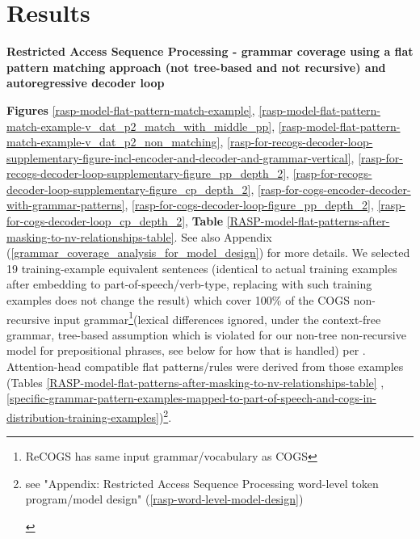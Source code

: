 \documentclass[11pt]{article}
\begin{document}
\section{Results}
\textbf{Restricted Access Sequence Processing - grammar coverage using a flat pattern matching approach (not tree-based and not recursive) and autoregressive decoder loop}

\textbf{Figures} \ref{rasp-model-flat-pattern-match-example}, \ref{rasp-model-flat-pattern-match-example-v_dat_p2_match_with_middle_pp}, \ref{rasp-model-flat-pattern-match-example-v_dat_p2_non_matching}, \ref{rasp-for-recogs-decoder-loop-supplementary-figure-incl-encoder-and-decoder-and-grammar-vertical}, \ref{rasp-for-recogs-decoder-loop-supplementary-figure_pp_depth_2}, \ref{rasp-for-recogs-decoder-loop-supplementary-figure_cp_depth_2}, \ref{rasp-for-cogs-encoder-decoder-with-grammar-patterns}, \ref{rasp-for-cogs-decoder-loop-figure_pp_depth_2}, \ref{rasp-for-cogs-decoder-loop_cp_depth_2}, \textbf{Table} \ref{RASP-model-flat-patterns-after-masking-to-nv-relationships-table}. See also Appendix (\ref{grammar_coverage_analysis_for_model_design}) for more details. We selected 19 training-example equivalent sentences (identical to actual training examples after embedding to part-of-speech/verb-type, replacing with such training examples does not change the result) which cover 100\% of the COGS non-recursive input grammar\footnote{ReCOGS has same input grammar/vocabulary as COGS}(lexical differences ignored, under the context-free grammar, tree-based assumption which is violated for our non-tree non-recursive model for prepositional phrases, see below for how that is handled) per \cite{fuzzingbook2023:GrammarCoverageFuzzer}.
Attention-head compatible flat patterns/rules were derived from those examples (Tables \ref{RASP-model-flat-patterns-after-masking-to-nv-relationships-table} , \ref{specific-grammar-pattern-examples-mapped-to-part-of-speech-and-cogs-in-distribution-training-examples})\footnote{\begin{footnotesize}see "Appendix: Restricted Access Sequence Processing word-level token program/model design" (\ref{rasp-word-level-model-design})\end{footnotesize}}.
\end{document}
